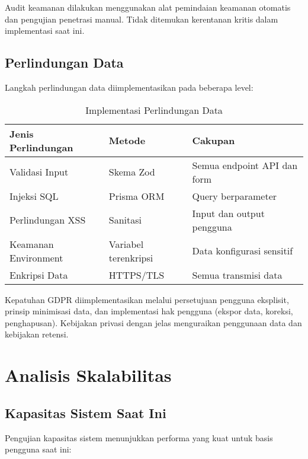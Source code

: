 Audit keamanan dilakukan menggunakan alat pemindaian keamanan otomatis dan pengujian penetrasi manual. Tidak ditemukan kerentanan kritis dalam implementasi saat ini.

\subsection{Perlindungan Data}

Langkah perlindungan data diimplementasikan pada beberapa level:

\begin{table}[ht]
\centering
\caption{Implementasi Perlindungan Data}
\label{tab:data-protection}
\footnotesize
\begin{adjustbox}{width=\textwidth,center}
\begin{tabular}{@{}p{4cm}p{3cm}p{6cm}@{}}
\toprule
\textbf{Jenis Perlindungan} & \textbf{Metode} & \textbf{Cakupan} \\
\midrule
Validasi Input & Skema Zod & Semua endpoint API dan form \\
\hline
Injeksi SQL & Prisma ORM & Query berparameter \\
\hline
Perlindungan XSS & Sanitasi & Input dan output pengguna \\
\hline
Keamanan Environment & Variabel terenkripsi & Data konfigurasi sensitif \\
\hline
Enkripsi Data & HTTPS/TLS & Semua transmisi data \\
\bottomrule
\end{tabular}
\end{adjustbox}
\end{table}

Kepatuhan GDPR diimplementasikan melalui persetujuan pengguna eksplisit, prinsip minimisasi data, dan implementasi hak pengguna (ekspor data, koreksi, penghapusan). Kebijakan privasi dengan jelas menguraikan penggunaan data dan kebijakan retensi.

\section{Analisis Skalabilitas}

\subsection{Kapasitas Sistem Saat Ini}

Pengujian kapasitas sistem menunjukkan performa yang kuat untuk basis pengguna saat ini:

